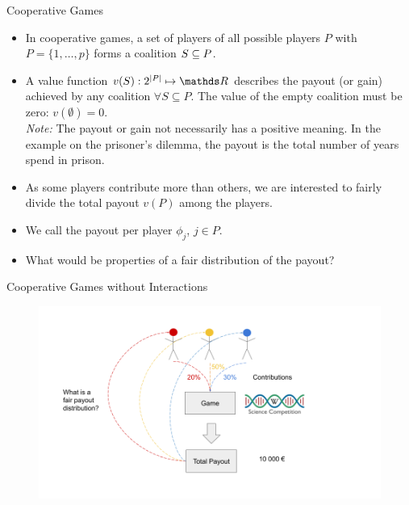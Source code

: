 \documentclass[11pt,compress,t,notes=noshow, aspectratio=169, xcolor=table]{beamer}
\begin{document}
\begin{vbframe}{Cooperative Games}
\begin{itemize}
\itemsep1em
  \item In cooperative games, a set of players of all possible players $P$ with $P = \{1, \hdots, p\}$ forms a coalition $\SsubP$.
  \item A value function $v(S): 2^{|P|}\mapsto \R$ describes the payout (or gain) achieved by any coalition $\forall S \subseteq P$. The value of the empty coalition must be zero: $v(\emptyset) = 0$.\\
  \textit{Note:} The payout or gain not necessarily has a positive meaning. In the example on the prisoner's dilemma, the payout is the total number of years spend in prison.
  \item As some players contribute more than others, we are interested to fairly divide the total payout $v(P)$ among the players.
  \item We call the payout per player $\phi_j$, $j \in P$.
  \item What would be properties of a fair distribution of the payout?
\end{itemize}
\end{vbframe}

\begin{vbframe}{Cooperative Games without Interactions}


\begin{figure}
    \centering
    \includegraphics{figure/Shapley_1.png}
\end{figure}

\end{vbframe}
\end{document}
